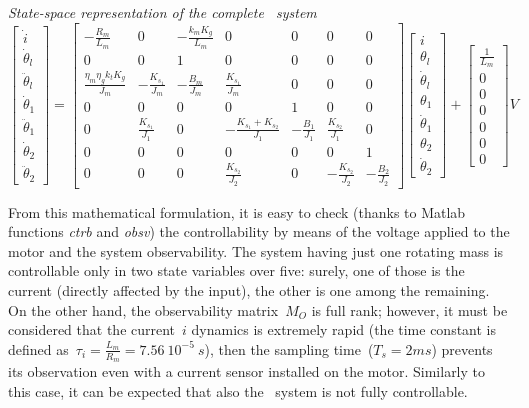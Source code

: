 \noindent \textit{State-space representation of the complete \twodof\ system}
\begin{equation}
	\begin{bmatrix}
		\dot{i} \\
		\dot{\theta}_l \\
		\ddot{\theta}_l \\
		\dot{\theta}_1 \\
		\ddot{\theta}_1 \\
		\dot{\theta}_2 \\
		\ddot{\theta}_2
	\end{bmatrix}
	=
	\begin{bmatrix}
		-\frac{R_m}{L_m} & 0 & -\frac{k_m K_g}{L_m} & 0 & 0 & 0 & 0 \\
		0 & 0 &1 & 0 & 0 & 0 & 0 \\
		\frac{\eta_m \eta_g k_t K_g}{J_m} & -\frac{K_{s_1}}{J_m} & -\frac{B_m}{J_m} & \frac{K_{s_1}}{J_m} & 0 & 0 & 0 \\
		0 & 0 & 0 & 0 & 1 & 0 & 0 \\
		0 & \frac{K_{s_1}}{J_1} & 0 & -\frac{K_{s_1}+K_{s_2}}{J_1} & -\frac{B_1}{J_1} & \frac{K_{s_2}}{J_1} & 0 \\
		0 & 0 & 0 & 0 & 0 & 0 & 1 \\
		0 & 0 & 0 & \frac{K_{s_2}}{J_2} & 0 & -\frac{K_{s_2}}{J_2} & -\frac{B_2}{J_2}
	\end{bmatrix}
	\begin{bmatrix}
		i \\
		\theta_l \\
		\dot{\theta}_l \\
		\theta_1 \\
		\dot{\theta}_1 \\
		\theta_2 \\
		\dot{\theta}_2
	\end{bmatrix}
	+
	\begin{bmatrix}
		\frac{1}{L_m} \\
		0 \\
		0 \\
		0 \\
		0 \\
		0 \\
		0
	\end{bmatrix}
	V
\end{equation}

From this mathematical formulation, it is easy to check (thanks to Matlab functions  \textit{ctrb} and \textit{obsv}) the controllability by means of the voltage applied to the motor and the system observability.
The system having just one rotating mass is controllable only in two state variables over five: surely, one of those is the current (directly affected by the input), the other is one among the remaining. On the other hand, the observability matrix~$M_O$ is full rank; however, it must be considered that the current~$i$ dynamics is extremely rapid (the time constant is defined as~$\tau_i = \frac{L_m}{R_m} = 7.56\ 10^{-5} \ s$), then the sampling time~($T_s = 2 ms$) prevents its observation even with a current sensor installed on the motor.
Similarly to this case, it can be expected that also the \twodof~system is not fully controllable. \\

